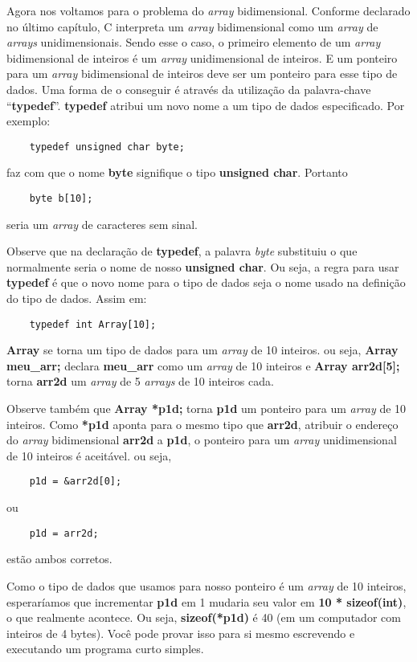 Agora nos voltamos para o problema do \textit{array} bidimensional. Conforme declarado no último capítulo, C interpreta um \textit{array} bidimensional como um \textit{array} de \textit{arrays} unidimensionais. Sendo esse o caso, o primeiro elemento de um \textit{array} bidimensional de inteiros é um \textit{array} unidimensional de inteiros. E um ponteiro para um \textit{array} bidimensional de inteiros deve ser um ponteiro para esse tipo de dados. Uma forma de o conseguir é através da utilização da palavra-chave ``\textbf{typedef}''. \textbf{typedef} atribui um novo nome a um tipo de dados especificado. Por exemplo:
\begin{lstlisting}
	typedef unsigned char byte;
\end{lstlisting}
faz com que o nome \textbf{byte} signifique o tipo \textbf{unsigned char}. Portanto
\begin{lstlisting}
	byte b[10];
\end{lstlisting}
seria um \textit{array} de caracteres sem sinal.

Observe que na declaração de \textbf{typedef}, a palavra \textit{byte} substituiu o que normalmente seria o nome de nosso \textbf{unsigned char}. Ou seja, a regra para usar \textbf{typedef} é que o novo nome para o tipo de dados seja o nome usado na definição do tipo de dados. Assim em:
\begin{lstlisting}
	typedef int Array[10];
\end{lstlisting}
\textbf{Array} se torna um tipo de dados para um \textit{array} de 10 inteiros. ou seja, \textbf{Array meu\_arr;} declara \textbf{meu\_arr} como um \textit{array} de 10 inteiros e \textbf{Array arr2d[5];} torna \textbf{arr2d} um \textit{array} de 5 \textit{arrays} de 10 inteiros cada.

Observe também que \textbf{Array *p1d;} torna \textbf{p1d} um ponteiro para um \textit{array} de 10 inteiros. Como \textbf{*p1d} aponta para o mesmo tipo que \textbf{arr2d}, atribuir o endereço do \textit{array} bidimensional \textbf{arr2d} a \textbf{p1d}, o ponteiro para um \textit{array} unidimensional de 10 inteiros é aceitável. ou seja, 
\begin{lstlisting}
	p1d = &arr2d[0];
\end{lstlisting}
ou
\begin{lstlisting}
	p1d = arr2d;
\end{lstlisting}
estão ambos corretos.

Como o tipo de dados que usamos para nosso ponteiro é um \textit{array} de 10 inteiros, esperaríamos que incrementar \textbf{p1d} em 1 mudaria seu valor em \textbf{10 * sizeof(int)}, o que realmente acontece. Ou seja, \textbf{sizeof(*p1d)} é 40 (em um computador com  inteiros de 4 bytes). Você pode provar isso para si mesmo escrevendo e executando um programa curto simples.

